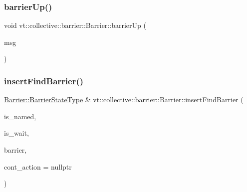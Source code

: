 \subsubsection{\texorpdfstring{barrier\+Up()}{barrierUp()}\hspace{0.1cm}{\footnotesize\ttfamily [2/2]}}
{\footnotesize\ttfamily void vt\+::collective\+::barrier\+::\+Barrier\+::barrier\+Up (\begin{DoxyParamCaption}\item[{\hyperlink{structvt_1_1collective_1_1barrier_1_1_barrier_msg}{Barrier\+Msg} $\ast$}]{msg }\end{DoxyParamCaption})\hspace{0.3cm}{\ttfamily [static]}}

\mbox{\label{structvt_1_1collective_1_1barrier_1_1_barrier_aa3f74f986e523701c1d85ed97d3ad5a4}} 
\subsubsection{\texorpdfstring{insert\+Find\+Barrier()}{insertFindBarrier()}}
{\footnotesize\ttfamily \hyperlink{structvt_1_1collective_1_1barrier_1_1_barrier_a9b612818f7b44ca65f2caee0dee094f3}{Barrier\+::\+Barrier\+State\+Type} \& vt\+::collective\+::barrier\+::\+Barrier\+::insert\+Find\+Barrier (\begin{DoxyParamCaption}\item[{bool const \&}]{is\+\_\+named,  }\item[{bool const \&}]{is\+\_\+wait,  }\item[{\hyperlink{namespacevt_a25e481f0d6bbc7204db23d1c87a62e77}{Barrier\+Type} const \&}]{barrier,  }\item[{\hyperlink{namespacevt_ae0a5a7b18cc99d7b732cb4d44f46b0f3}{Action\+Type}}]{cont\+\_\+action = {\ttfamily nullptr} }\end{DoxyParamCaption})}

\mbox{\label{structvt_1_1collective_1_1barrier_1_1_barrier_a0d8e74149ddca96f06c1ff6071b73a74}} 
